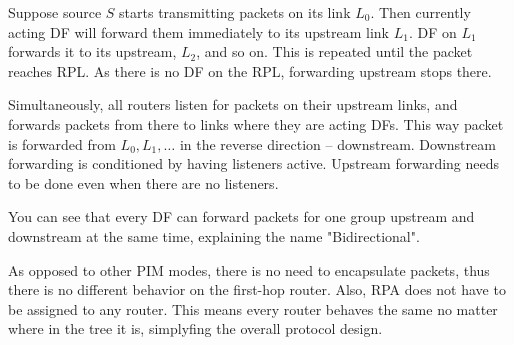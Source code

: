 Suppose source $S$ starts transmitting packets on its link $L_0$. Then
currently acting DF will forward them immediately to its upstream link $L_1$.
DF on $L_1$ forwards it to its upstream, $L_2$, and so on. This is repeated
until the packet reaches RPL. As there is no DF on the RPL, forwarding upstream stops
there.

Simultaneously, all routers listen for packets on their upstream links, and
forwards packets from there to links where they are acting DFs. This way packet
is forwarded from $L_0, L_1, \dots$ in the reverse direction -- downstream.
Downstream forwarding is conditioned by having listeners active. Upstream
forwarding needs to be done even when there are no listeners.

You can see that every DF can forward packets for one group upstream and
downstream at the same time, explaining the name "Bidirectional".

As opposed to other PIM modes, there is no need to encapsulate packets, thus
there is no different behavior on the first-hop router. Also, RPA does not have
to be assigned to any router. This means every router behaves the same no
matter where in the tree it is, simplyfing the overall protocol design.
